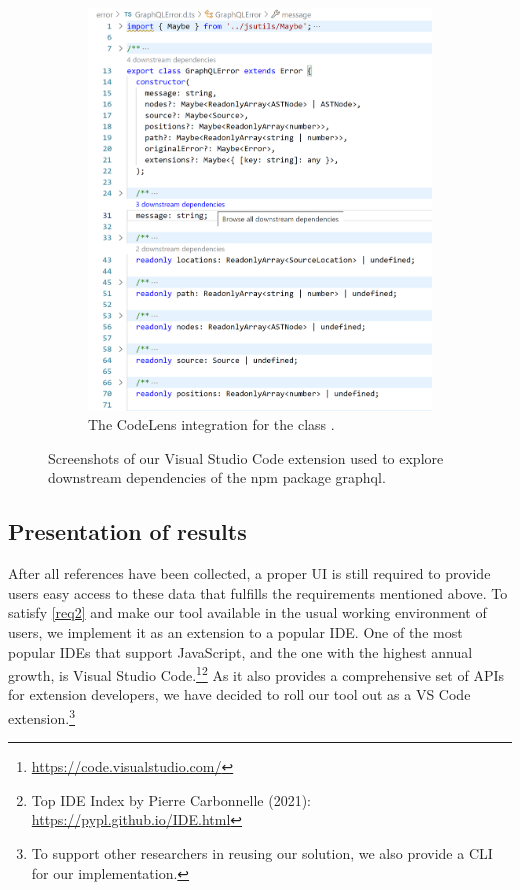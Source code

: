 \begin{figure}[b]
\begin{subfigure}{.32\linewidth}
		\includegraphics[width=\linewidth]{sections/6_implementation/extension/codelens.png}
		\caption[LoF entry]{The CodeLens integration for the class .}
		\label{fig:implementation/presentation/screenshot/codelens}
	\end{subfigure}

	\caption{Screenshots of our Visual Studio Code extension used to explore downstream dependencies of the npm package graphql.}
	\label{fig:implementation/presentation/screenshots}
\end{figure}

\subsection{Presentation of results}
\label{sec:implementation/presentation}

After all references have been collected, a proper UI is still required to provide users easy access to these data that fulfills the requirements mentioned above.
To satisfy \cref{req2} and make our tool available in the usual working environment of users, we implement it as an extension to a popular IDE.
One of the most popular IDEs that support JavaScript, and the one with the highest annual growth, is Visual Studio Code.\footnote{\url{https://code.visualstudio.com/}}\footnote{Top IDE Index by Pierre Carbonnelle (2021): \url{https://pypl.github.io/IDE.html}}
As it also provides a comprehensive set of APIs for extension developers, we have decided to roll our tool out as a VS Code extension.\footnote{To support other researchers in reusing our solution, we also provide a CLI for our implementation.}

